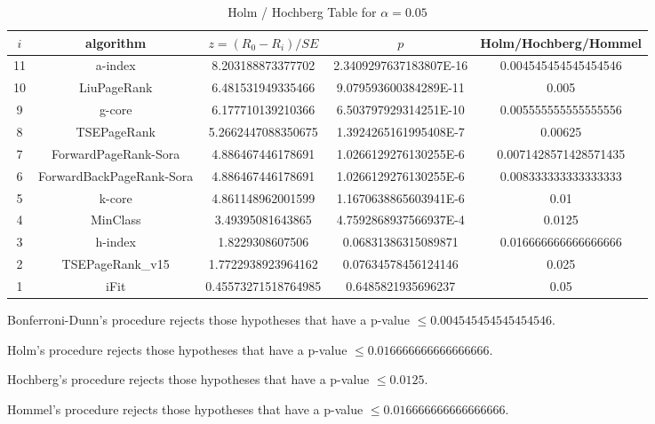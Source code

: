 \documentclass[a4paper,10pt]{article}
\begin{document}
\begin{landscape}
\begin{table}[!htp]
\centering\tiny
\caption{Holm / Hochberg Table for $\alpha=0.05$}
\begin{tabular}{ccccc}
$i$&algorithm&$z=(R_0 - R_i)/SE$&$p$&Holm/Hochberg/Hommel\\
\hline
11&a-index&8.203188873377702&2.3409297637183807E-16&0.004545454545454546\\
10&LiuPageRank&6.481531949335466&9.079593600384289E-11&0.005\\
9&g-core&6.177710139210366&6.503797929314251E-10&0.005555555555555556\\
8&TSEPageRank&5.2662447088350675&1.3924265161995408E-7&0.00625\\
7&ForwardPageRank-Sora&4.886467446178691&1.0266129276130255E-6&0.0071428571428571435\\
6&ForwardBackPageRank-Sora&4.886467446178691&1.0266129276130255E-6&0.008333333333333333\\
5&k-core&4.861148962001599&1.1670638865603941E-6&0.01\\
4&MinClass&3.49395081643865&4.7592868937566937E-4&0.0125\\
3&h-index&1.8229308607506&0.06831386315089871&0.016666666666666666\\
2&TSEPageRank_v15&1.7722938923964162&0.07634578456124146&0.025\\
1&iFit&0.45573271518764985&0.6485821935696237&0.05\\
\hline
\end{tabular}
\end{table}
Bonferroni-Dunn's procedure rejects those hypotheses that have a p-value $\le0.004545454545454546$.


Holm's procedure rejects those hypotheses that have a p-value $\le0.016666666666666666$.


Hochberg's procedure rejects those hypotheses that have a p-value $\le0.0125$.


Hommel's procedure rejects those hypotheses that have a p-value $\le0.016666666666666666$.



\end{landscape}
\end{document}

